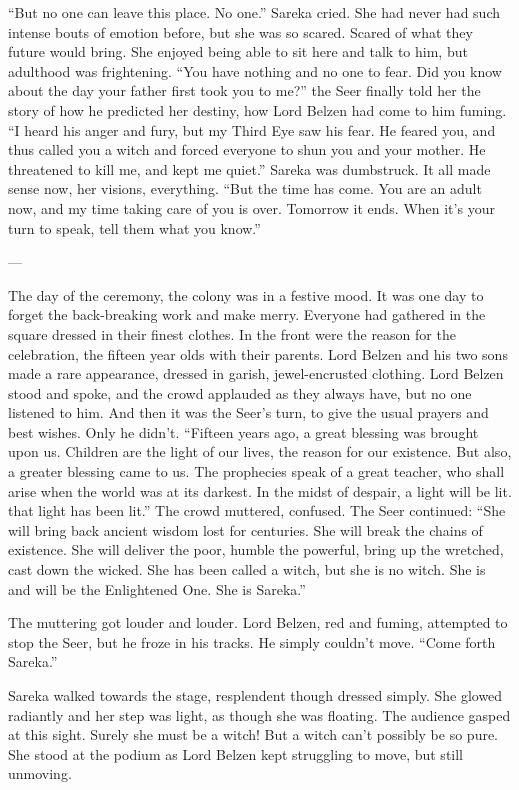 “But no one can leave this place. No one.” Sareka cried. She had never had such intense bouts of emotion before, but she was so scared. Scared of what they future would bring. She enjoyed being able to sit here and talk to him, but adulthood was frightening. “You have nothing and no one to fear. Did you know about the day your father first took you to me?” the Seer finally told her the story of how he predicted her destiny, how Lord Belzen had come to him fuming. “I heard his anger and fury, but my Third Eye saw his fear. He feared you, and thus called you a witch and forced everyone to shun you and your mother. He threatened to kill me, and kept me quiet.” Sareka was dumbstruck. It all made sense now, her visions, everything. “But the time has come. You are an adult now, and my time taking care of you is over. Tomorrow it ends. When it’s your turn to speak, tell them what you know.”

---

The day of the ceremony, the colony was in a festive mood. It was one day to forget the back-breaking work and make merry. Everyone had gathered in the square dressed in their finest clothes. In the front were the reason for the celebration, the fifteen year olds with their parents. Lord Belzen and his two sons made a rare appearance, dressed in garish, jewel-encrusted clothing. Lord Belzen stood and spoke, and the crowd applauded as they always have, but no one listened to him. And then it was the Seer’s turn, to give the usual prayers and best wishes. Only he didn’t.
“Fifteen years ago, a great blessing was brought upon us. Children are the light of our lives, the reason for our existence. But also, a greater blessing came to us. The prophecies speak of a great teacher, who shall arise when the world was at its darkest. In the midst of despair, a light will be lit. that light has been lit.”
The crowd muttered, confused. The Seer continued: “She will bring back ancient wisdom lost for centuries. She will break the chains of existence. She will deliver the poor, humble the powerful, bring up the wretched, cast down the wicked. She has been called a witch, but she is no witch. She is and will be the Enlightened One. She is Sareka.”

The muttering got louder and louder. Lord Belzen, red and fuming, attempted to stop the Seer, but he froze in his tracks. He simply couldn’t move. “Come forth Sareka.”

Sareka walked towards the stage, resplendent though dressed simply. She glowed radiantly and her step was light, as though she was floating. The audience gasped at this sight. Surely she must be a witch! But a witch can’t possibly be so pure. She stood at the podium as Lord Belzen kept struggling to move, but still unmoving.

